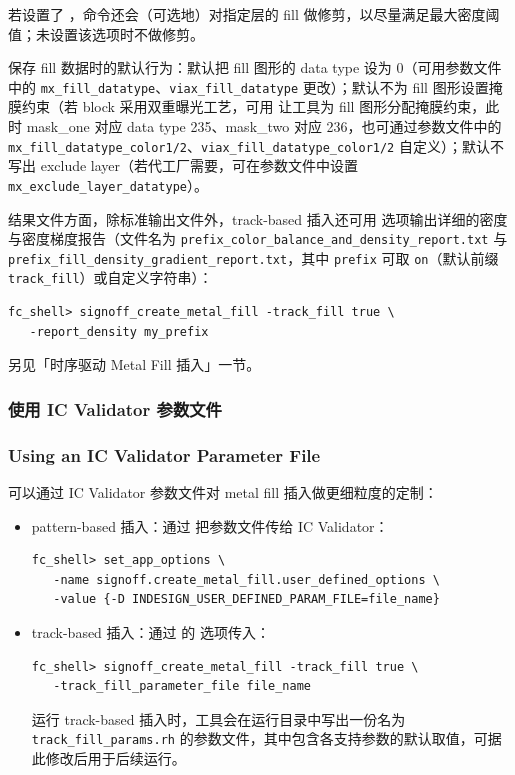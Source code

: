 若设置了 ，命令还会（可选地）对指定层的 fill 做修剪，以尽量满足最大密度阈值；未设置该选项时不做修剪。

保存 fill 数据时的默认行为：默认把 fill 图形的 data type 设为 0（可用参数文件中的 \texttt{mx\_fill\_datatype}、\texttt{viax\_fill\_datatype} 更改）；默认不为 fill 图形设置掩膜约束（若 block 采用双重曝光工艺，可用  让工具为 fill 图形分配掩膜约束，此时 mask\_one 对应 data type 235、mask\_two 对应 236，也可通过参数文件中的 \texttt{mx\_fill\_datatype\_color1/2}、\texttt{viax\_fill\_datatype\_color1/2} 自定义）；默认不写出 exclude layer（若代工厂需要，可在参数文件中设置 \texttt{mx\_exclude\_layer\_datatype}）。

结果文件方面，除标准输出文件外，track-based 插入还可用  选项输出详细的密度与密度梯度报告（文件名为 \texttt{prefix\_color\_balance\_and\_density\_report.txt} 与 \texttt{prefix\_fill\_density\_gradient\_report.txt}，其中 \texttt{prefix} 可取 \texttt{on}（默认前缀 \texttt{track\_fill}）或自定义字符串）：

\begin{lstlisting}
fc_shell> signoff_create_metal_fill -track_fill true \
   -report_density my_prefix
\end{lstlisting}

\begin{seeAlsoBox}
另见「时序驱动 Metal Fill 插入」一节。
\end{seeAlsoBox}

\subsubsection{使用 IC Validator 参数文件}
\subsubsection*{Using an IC Validator Parameter File}

可以通过 IC Validator 参数文件对 metal fill 插入做更细粒度的定制：
\begin{itemize}
  \item pattern-based 插入：通过  把参数文件传给 IC Validator：
\begin{lstlisting}
fc_shell> set_app_options \
   -name signoff.create_metal_fill.user_defined_options \
   -value {-D INDESIGN_USER_DEFINED_PARAM_FILE=file_name}
\end{lstlisting}
  \item track-based 插入：通过  的  选项传入：
\begin{lstlisting}
fc_shell> signoff_create_metal_fill -track_fill true \
   -track_fill_parameter_file file_name
\end{lstlisting}
        运行 track-based 插入时，工具会在运行目录中写出一份名为 \texttt{track\_fill\_params.rh} 的参数文件，其中包含各支持参数的默认取值，可据此修改后用于后续运行。
\end{itemize}

